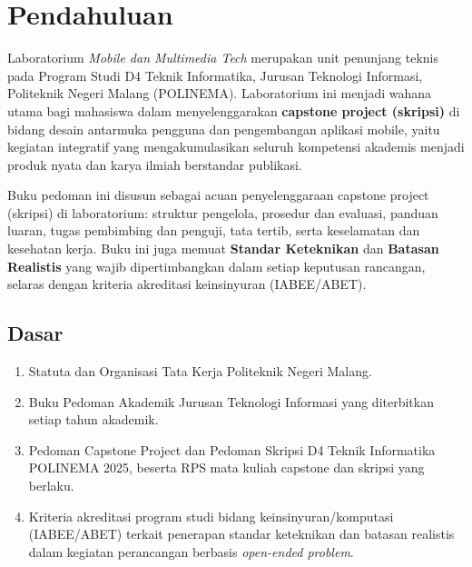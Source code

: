 \documentclass[12pt,a4paper]{report}
\begin{document}
\PedomanCover

\clearpage
\tableofcontents

\clearpage
{}

\chapter{Pendahuluan}

Laboratorium \emph{Mobile dan Multimedia Tech} merupakan unit penunjang teknis pada Program Studi D4 Teknik Informatika, Jurusan Teknologi Informasi, Politeknik Negeri Malang (POLINEMA). Laboratorium ini menjadi wahana utama bagi mahasiswa dalam menyelenggarakan \textbf{capstone project (skripsi)} di bidang desain antarmuka pengguna dan pengembangan aplikasi mobile, yaitu kegiatan integratif yang mengakumulasikan seluruh kompetensi akademis menjadi produk nyata dan karya ilmiah berstandar publikasi.

Buku pedoman ini disusun sebagai acuan penyelenggaraan capstone project (skripsi) di laboratorium: struktur pengelola, prosedur dan evaluasi, panduan luaran, tugas pembimbing dan penguji, tata tertib, serta keselamatan dan kesehatan kerja. Buku ini juga memuat \textbf{Standar Keteknikan} dan \textbf{Batasan Realistis} yang wajib dipertimbangkan dalam setiap keputusan rancangan, selaras dengan kriteria akreditasi keinsinyuran (IABEE/ABET).

\section{Dasar}
\begin{enumerate}
\item Statuta dan Organisasi Tata Kerja Politeknik Negeri Malang.
\item Buku Pedoman Akademik Jurusan Teknologi Informasi yang diterbitkan setiap tahun akademik.
\item Pedoman Capstone Project dan Pedoman Skripsi D4 Teknik Informatika POLINEMA 2025, beserta RPS mata kuliah capstone dan skripsi yang berlaku.
\item Kriteria akreditasi program studi bidang keinsinyuran/komputasi (IABEE/ABET) terkait penerapan standar keteknikan dan batasan realistis dalam kegiatan perancangan berbasis \emph{open-ended problem}.
\end{enumerate}
\end{document}
